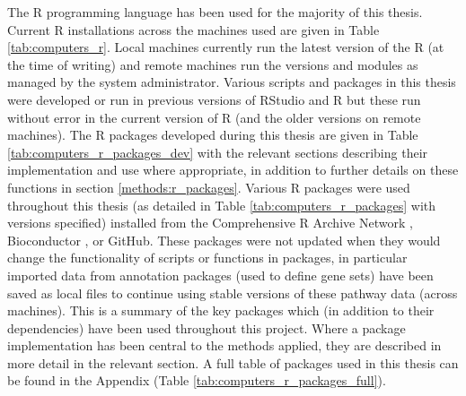 The R programming language has been used for the majority of this thesis. Current R installations across the machines used are given in Table \ref{tab:computers_r}. Local machines currently run the latest version of the R (at the time of writing) and remote machines run the versions and modules as managed by the system administrator. Various scripts and packages in this thesis were developed or run in previous versions of RStudio and R but these run without error in the current version of R (and the older versions on remote machines). The R packages developed during this thesis are given in Table \ref{tab:computers_r_packages_dev} with the relevant sections describing their implementation and use where appropriate, in addition to further details on these functions in section \ref{methods:r_packages}. Various R packages were used throughout this thesis (as detailed in Table \ref{tab:computers_r_packages} with versions specified) installed from the Comprehensive R Archive Network \citep{CRAN}, Bioconductor \citep[][version 3.4; BiocInstaller 1.24.0]{Gentleman2004} , or GitHub. These packages were not updated when they would change the functionality of scripts or functions in packages, in particular imported data from annotation packages (used to define gene sets) have been saved as local files to continue using stable versions of these pathway data (across machines). This is a summary of the key packages which (in addition to their dependencies) have been used throughout this project. Where a package implementation has been central to the methods applied, they are described in more detail in the relevant section. A full table of packages used in this thesis can be found in the Appendix (Table \ref{tab:computers_r_packages_full}).  

